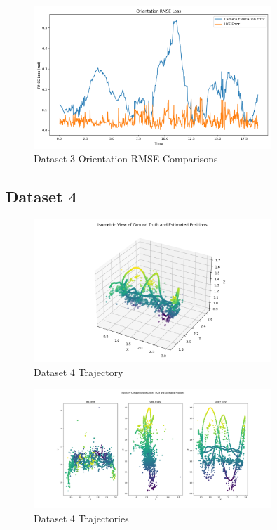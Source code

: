 \documentclass{article}
\begin{document}
\begin{figure}[H]
    \centering
    \includegraphics[width=0.8\textwidth]{./imgs/task4/studentdata3_ukf_orientation_rmse.png}
    \caption{Dataset 3 Orientation RMSE Comparisons}
\end{figure}

\subsection*{Dataset 4}

\begin{figure}[H]
    \centering
    \includegraphics[width=0.8\textwidth]{./imgs/task4/studentdata4_ukf_isometric.png}
    \caption{Dataset 4 Trajectory}
\end{figure}

\begin{figure}[H]
    \centering
    \includegraphics[width=0.8\textwidth]{./imgs/task4/studentdata4_ukf_positions.png}
    \caption{Dataset 4 Trajectories}
\end{figure}
\end{document}
